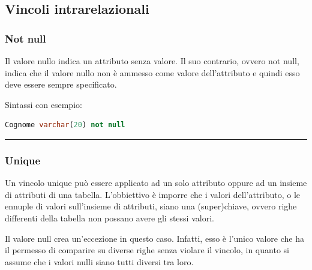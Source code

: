 \documentclass[a4paper]{article}
\newcommand{\longline}{\noindent\rule{\textwidth}{0.4pt}}
\begin{document}
	\subsection{Vincoli intrarelazionali}\label{par: vincoli intrarelazionali}
	
	\subsubsection{\textsf{Not null}}
	
	Il valore nullo indica un attributo senza valore. Il suo contrario, ovvero \textsf{not null}, indica che il valore nullo non è ammesso come valore dell'attributo e quindi esso deve essere sempre specificato.\newline
	
	\noindent
	Sintassi con esempio:
\begin{lstlisting}[language=SQL]
Cognome varchar(20) not null \end{lstlisting}	
	
	\longline
	
	\subsubsection{\textsf{Unique}}

	Un vincolo \textsf{unique} può essere applicato ad un solo attributo oppure ad un insieme di attributi di una tabella. L'obbiettivo è imporre che i valori dell'attributo, o le ennuple di valori sull'insieme di attributi, siano una (super)chiave, ovvero righe differenti della tabella non possano avere gli stessi valori.

	Il valore \textsf{null} crea un'eccezione in questo caso. Infatti, esso è l'unico valore che ha il permesso di comparire su diverse righe senza violare il vincolo, in quanto si assume che i valori nulli siano tutti diversi tra loro.\newline
\end{document}
